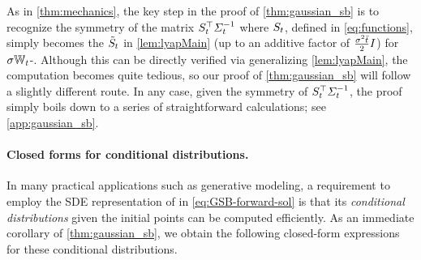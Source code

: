 As in \cref{thm:mechanics}, the key step in the proof of \cref{thm:gaussian_sb} is to recognize the symmetry of the matrix $S_{t}^\top \Sigma^{-1}_{ t }$ where $S_{t}$, defined in \eqref{eq:functions}, simply becomes the $\tilde{S}_{t}$ in \cref{lem:lyapMain} (up to an additive factor of $\frac{\sigma^2\bar{t}}{2}I$) for $\sigma\mathbb{W}_{t}$-. Although this can be directly verified via generalizing \cref{lem:lyapMain}, the computation becomes quite tedious, so our proof of \cref{thm:gaussian_sb} will follow a slightly different route. In any case, given the symmetry of $S_{t}^\top \Sigma^{-1}_{ t }$, the proof simply boils down to a series of straightforward calculations; see \cref{app:gaussian_sb}.


\paragraph{Closed forms for conditional distributions.}
In many practical applications such as generative modeling, a requirement to employ the \acrshort{SDE} representation of  in \eqref{eq:GSB-forward-sol} is that its \emph{conditional distributions} given the initial points can be computed efficiently. As an immediate corollary of \cref{thm:gaussian_sb}, we obtain the following closed-form expressions for these conditional distributions. %
